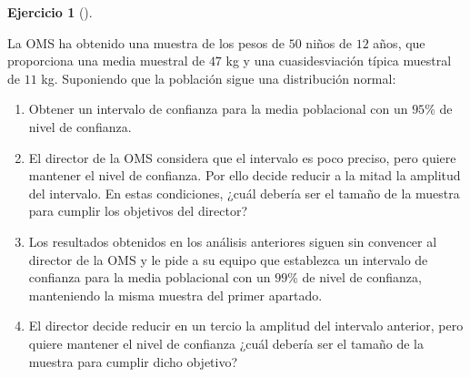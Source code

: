 \documentclass[
  a4paper,
]{scrreport}
\theoremstyle{definition}
\newtheorem{exercise}{Ejercicio}[chapter]
\theoremstyle{remark}
\begin{document}
\begin{exercise}[]\protect\hypertarget{exr-intervalo-confianza-media-peso}{}\label{exr-intervalo-confianza-media-peso}

La OMS ha obtenido una muestra de los pesos de \(50\) niños de \(12\)
años, que proporciona una media muestral de \(47\) kg y una
cuasidesviación típica muestral de \(11\) kg. Suponiendo que la
población sigue una distribución normal:

\begin{enumerate}
\def\labelenumi{\alph{enumi}.}
\item
  Obtener un intervalo de confianza para la media poblacional con un
  \(95\)\% de nivel de confianza.
\item
  El director de la OMS considera que el intervalo es poco preciso, pero
  quiere mantener el nivel de confianza. Por ello decide reducir a la
  mitad la amplitud del intervalo. En estas condiciones, ¿cuál debería
  ser el tamaño de la muestra para cumplir los objetivos del director?
\item
  Los resultados obtenidos en los análisis anteriores siguen sin
  convencer al director de la OMS y le pide a su equipo que establezca
  un intervalo de confianza para la media poblacional con un \(99\)\% de
  nivel de confianza, manteniendo la misma muestra del primer apartado.
\item
  El director decide reducir en un tercio la amplitud del intervalo
  anterior, pero quiere mantener el nivel de confianza ¿cuál debería ser
  el tamaño de la muestra para cumplir dicho objetivo?
\end{enumerate}

\end{exercise}
\end{document}
